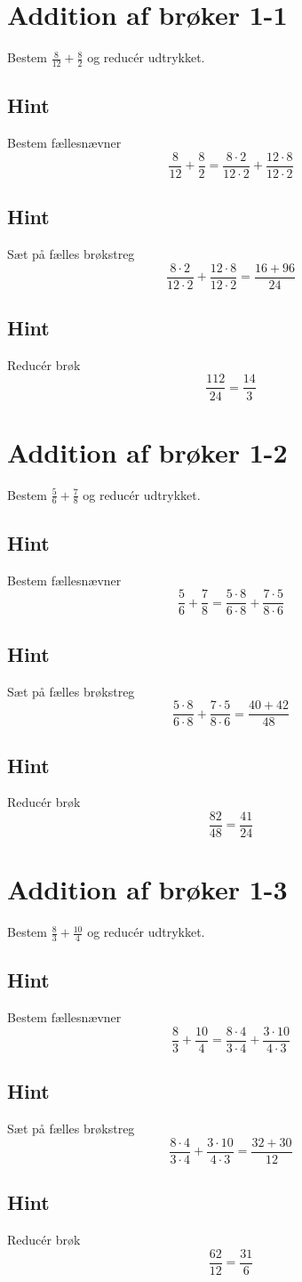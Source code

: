 \documentclass{article}
\newenvironment{exercise}[1]{\newpage\section{#1}}{}
\newcommand{\answerbox}[1]{\fbox{$#1$}}
\newcommand{\hint}{\subsection*{Hint}}
\begin{document}
	\tableofcontents
	\newpage
	
	\begin{exercise}{Addition af brøker 1-1}
		
		Bestem $\frac{8}{12}+\frac{8}{2}$ og reducér udtrykket.
		
		\answerbox{\frac{14}{3}}
		
		\hint
		
		Bestem fællesnævner
		\[
		\frac{8}{12}+\frac{8}{2}  = \frac{8 \cdot 2}{12 \cdot 2}+\frac{12 \cdot 8}{12\cdot 2} 
		\]
		
		\hint
		
		Sæt på fælles brøkstreg
		\[
		\frac{8 \cdot 2}{12 \cdot 2}+\frac{12 \cdot 8}{12\cdot 2} = \frac{16+96}{24} 
		\]
		
		\hint
		
		Reducér brøk
		\[
		\frac{112}{24} = \frac{14}{3}
		\]
		
	\end{exercise}
	
	\newpage
	
	\begin{exercise}{Addition af brøker 1-2}
		
		Bestem $\frac{5}{6}+\frac{7}{8}$ og reducér udtrykket.
		
		\answerbox{\frac{41}{24}}
		
		\hint
		
		Bestem fællesnævner
		\[
		\frac{5}{6}+\frac{7}{8}  = \frac{5 \cdot 8 }{6 \cdot 8}+\frac{7 \cdot 5}{8\cdot 6} 
		\]
		
		\hint
		
		Sæt på fælles brøkstreg
		\[
		\frac{5 \cdot 8 }{6 \cdot 8}+\frac{7 \cdot 5}{8\cdot 6}  = \frac{40+42}{48} 
		\]
		
		\hint
		
		Reducér brøk
		\[
		\frac{82}{48} = \frac{41}{24}
		\]
		
	\end{exercise}
	
	\newpage
	
	\begin{exercise}{Addition af brøker 1-3}
		
		Bestem $\frac{8}{3}+\frac{10}{4}$ og reducér udtrykket.
		
		\answerbox{\frac{31}{6}}
		
		\hint
		
		Bestem fællesnævner
		\[
		\frac{8}{3}+\frac{10}{4}  = \frac{8 \cdot 4 }{3 \cdot 4}+\frac{3 \cdot 10}{4\cdot 3} 
		\]
		
		\hint
		
		Sæt på fælles brøkstreg
		\[
		\frac{8 \cdot 4 }{3 \cdot 4}+\frac{3 \cdot 10}{4\cdot 3}  = \frac{32+30}{12} 
		\]
		
		\hint
		
		Reducér brøk
		\[
		\frac{62}{12} = \frac{31}{6}
		\]
		
	\end{exercise}
	
\end{document}
